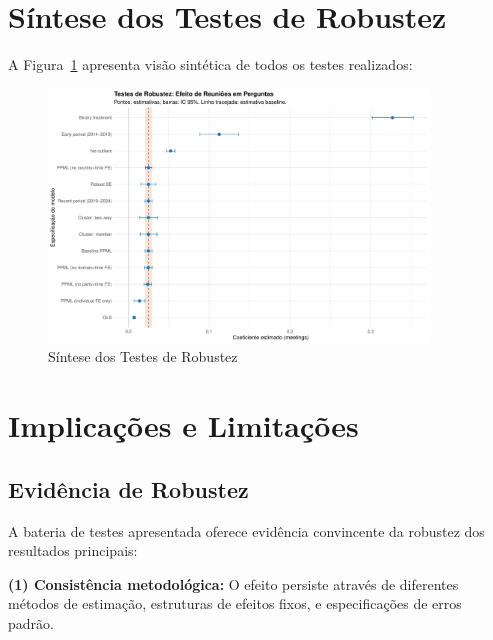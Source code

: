 \section{Síntese dos Testes de Robustez}

A Figura~\ref{fig:robustness_overview} apresenta visão sintética de todos os testes realizados:

\begin{figure}[htbp]
    \centering
    \includegraphics[width=0.9\textwidth]{figures/robustness/robustness_coefficients.pdf}
    \caption{Síntese dos Testes de Robustez}
    \label{fig:robustness_overview}
\end{figure}

\section{Implicações e Limitações}

\subsection{Evidência de Robustez}

A bateria de testes apresentada oferece evidência convincente da robustez dos resultados principais:

\textbf{(1) Consistência metodológica:} O efeito persiste através de diferentes métodos de estimação, estruturas de efeitos fixos, e especificações de erros padrão.

